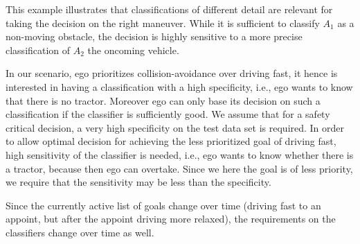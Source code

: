 This example illustrates that classifications of different detail are relevant for taking the decision on the right maneuver. While it is sufficient to classify $A_1$ as a non-moving obstacle, the decision is highly sensitive to a more precise classification of $A_2$ the oncoming vehicle.


In our scenario, ego prioritizes collision-avoidance over driving fast, it hence is interested in having a classification with a high specificity, i.e., ego wants to know that there is no tractor. Moreover ego can only base its decision on such a classification if the classifier is sufficiently good. We assume that for a safety critical decision, a very high specificity on the test data set is required.
In order to allow optimal decision for achieving the less prioritized goal of driving fast, high sensitivity of the classifier is needed, i.e., ego wants to know whether there is a tractor, because then ego can overtake. Since we here the goal is of less priority, we require that the sensitivity may be less than the specificity. 

Since the currently active list of goals change over time (driving fast to an appoint, but after the appoint driving more relaxed), the requirements on the classifiers change over time as well.  





